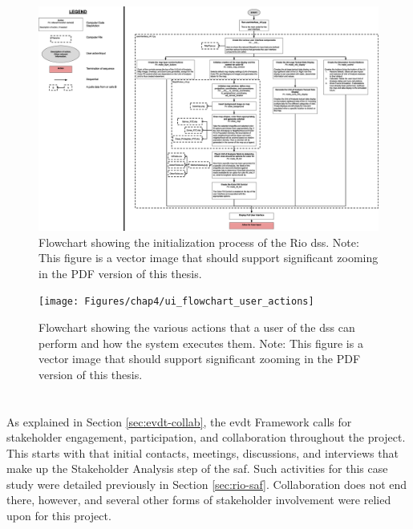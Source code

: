 \begin{landscape}

\begin{figure}[t] 
\centering
\includegraphics[scale=0.2]{Figures/chap4/ui_flowchart_initialization}
\caption[Flowchart of Rio DSS Initialization]{Flowchart showing the initialization process of the Rio \ac{dss}. Note: This figure is a vector image that should support significant zooming in the PDF version of this thesis.}
\label{fig:ui_flowchart_initialization}
\end{figure}

\begin{figure}[t] 
\centering
\texttt{[image: Figures/chap4/ui\_flowchart\_user\_actions]}
\caption[Flowchart of Rio DSS Actions]{Flowchart showing the various actions that a user of the \ac{dss} can perform and how the system executes them. Note: This figure is a vector image that should support significant zooming in the PDF version of this thesis.}
\label{fig:ui_flowchart_user_actions}
\end{figure}
\end{landscape}

\section{} \label{sec:rio-collab}

As explained in Section \ref{sec:evdt-collab}, the \ac{evdt} Framework calls for stakeholder engagement, participation, and collaboration throughout the project. This starts with that initial contacts, meetings, discussions, and interviews that make up the Stakeholder Analysis step of the \ac{saf}. Such activities for this case study were detailed previously in Section \ref{sec:rio-saf}. Collaboration does not end there, however, and several other forms of stakeholder involvement were relied upon for this project.

